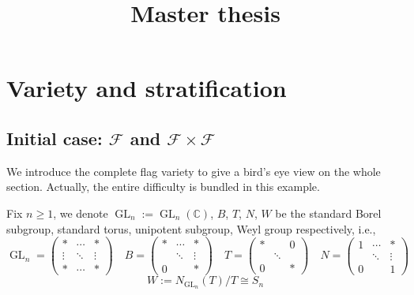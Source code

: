 \documentclass[reqno,11pt]{book}
\numberwithin{equation}{section}
\theoremstyle{plain}
\theoremstyle{plain}
\numberwithin{equation}{section}
\theoremstyle{remark}
\DeclareMathOperator{\GL}{\operatorname{GL}}
\begin{document}
\date{}

\title
{Master thesis
}





\setcounter{tocdepth}{1}
\maketitle
\tableofcontents
\chapter{Variety and stratification}

\section{Initial case: $\mathcal{F}$ and $\mathcal{F} \times \mathcal{F}$}

We introduce the complete flag variety to give a bird's eye view on the whole section. Actually, the entire difficulty is bundled in this example.

Fix $n \geqslant 1$, we denote $\GL_n:=\GL_n(\mathbb{C})$, $B$, $T$, $N$, $W$ be the standard Borel subgroup, standard torus, unipotent subgroup, Weyl group respectively, i.e.,
{
\setlength\arraycolsep{1pt}
\renewcommand{\arraystretch}{0.6}
$$\GL_n= \begin{pmatrix}
* & \cdots & * \\[-1.4mm]
\vdots & \ddots & \vdots \\
* & \cdots & * 
\end{pmatrix} \quad
B= \begin{pmatrix}
* & \cdots & * \\[-1.4mm]
 & \ddots & \vdots \\
\scriptstyle 0 &  & * 
\end{pmatrix} \quad
T= \begin{pmatrix}
* &  & \scriptstyle 0 \\[-1.4mm]
 & \ddots &  \\
\scriptstyle 0 &  & * 
\end{pmatrix} \quad
N= \begin{pmatrix}
\scriptstyle 1 & \cdots & * \\[-1.4mm]
 & \ddots & \vdots \\
\scriptstyle 0 &  & \scriptstyle 1
\end{pmatrix} \quad
$$
$$W:= N_{\GL_n}(T)/T \cong S_n$$
}
\end{document}
